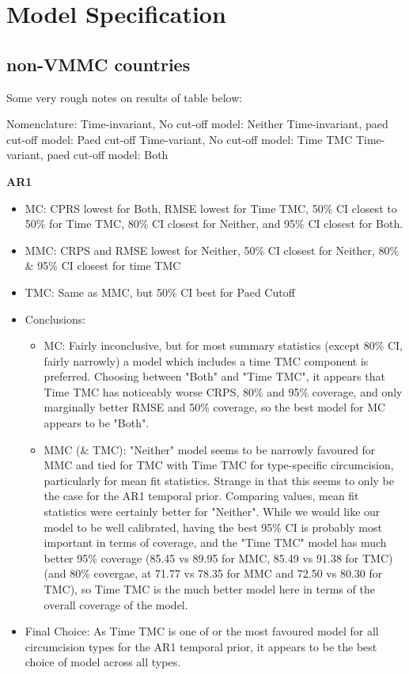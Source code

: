 \documentclass{article}
\begin{document}
\section{Model Specification}
\label{sec:org8802288}

\subsection{non-VMMC countries}
\label{sec:org09db5e8}


Some very rough notes on results of table below:

Nomenclature:
Time-invariant, No cut-off model: Neither
Time-invariant, paed cut-off model: Paed cut-off
Time-variant, No cut-off model: Time TMC
Time-variant, paed cut-off model: Both 


\textbf{AR1}
\begin{itemize}
    \item MC: CPRS lowest for Both, RMSE lowest for Time TMC, 50\% CI closest to 50\% for Time TMC, 80\% CI closest for Neither, and 95\% CI closest for Both.
    \item MMC: CRPS and RMSE lowest for Neither, 50\% CI closest for Neither, 80\% & 95\% CI closest for time TMC
    \item TMC: Same as MMC, but 50\% CI best for Paed Cutoff 
    \item Conclusions:
    \begin{itemize}
        \item MC: Fairly inconclusive, but for most summary statistics (except 80\% CI, fairly narrowly) a model which includes a time TMC component is preferred. Choosing between "Both" and "Time TMC", it appears that Time TMC has noticeably worse CRPS, 80\% and 95\% coverage, and only marginally better RMSE and 50\% coverage, so the best model for MC appears to be "Both".
        \item MMC (\& TMC): "Neither" model seems to be narrowly favoured for MMC and tied for TMC with Time TMC for type-specific circumcision, particularly for mean fit statistics. Strange in that this seems to only be the case for the AR1 temporal prior. Comparing values, mean fit statistics were certainly better for "Neither". While we would like our model to be well calibrated, having the best 95\% CI is probably most important in terms of coverage, and the "Time TMC" model has much better 95\% coverage (85.45 vs 89.95 for MMC, 85.49 vs 91.38 for TMC) (and 80\% covergae, at 71.77 vs 78.35 for MMC and 72.50 vs 80.30 for TMC), so Time TMC is the much better model here in terms of the overall coverage of the model. 
    \end{itemize}
    \item Final Choice: As Time TMC is one of or the most favoured model for all circumcision types for the AR1 temporal prior, it appears to be the best choice of model across all types. 
\end{itemize}
\end{document}
